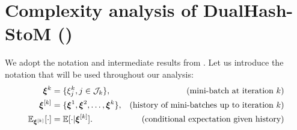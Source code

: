 \section{Complexity analysis of DualHash-StoM (\texorpdfstring{}{Algorithm 1})}
\label{Appendix: the complexity analysis of DualHash-StoM}
We adopt the notation and intermediate results from .
Let us introduce the notation that will be used throughout our analysis:
\begin{align*}
    \bm{\xi}^{k}                & = \{\xi_{j}^{k}, j \in \mathcal{J}_{k}\},        & \text{(mini-batch at iteration $k$)}                 \\
    \bm{\xi}^{[k]}              & = \{\bm{\xi}^{1}, \bm{\xi}^{2}, \ldots, \bm{\xi}^{k}\}, & \text{(history of mini-batches up to iteration $k$)} \\
    \mathbb{E}_{\bm{\xi}^{[k]}}[\cdot] & = \mathbb{E} [ \cdot | \bm{\xi}^{[k]}] .              & \text{(conditional expectation given history)}
\end{align*}

